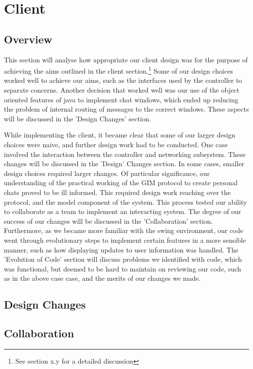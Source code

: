 \section{Client}

\subsection{Overview}

This section will analyse how appropriate our client design  was for the purpose of achieving the aims outlined in the client section.\footnote{See section x.y for a detailed discussion}  Some of our design choices worked well to achieve our aims, such as the interfaces used by the controller to separate concerns. Another decision that worked well was our use of the object oriented features of java to implement chat windows, which ended up reducing the problem of internal routing of messages to the correct windows. These aspects will be discussed in the 'Design Changes' section.

While implementing the client, it became clear that some of our larger design choices were naive, and further design work had to be conducted. One case involved the interaction between the controller and networking subsystem. These changes will be discussed in the 'Design' Changes section. In some cases, smaller design choices required larger changes. Of particular significance, our understanding of the practical working of the GIM protocol to create personal chats proved to be ill informed. This required design work reaching over the protocol, and the model component of the system. This process tested our ability to collaborate as a team to implement an interacting system. The degree of our success of our changes will be discussed in the 'Collaboration' section. Furthermore, as we became more familiar with the swing environment, our code went through evolutionary steps to implement certain features in a more sensible manner, such as how displaying updates to user information was handled. The 'Evolution of Code' section will discuss problems we identified with code, which was functional,  but deemed to be hard to maintain on reviewing our code, such as in the above case case, and the merits of our changes we made. 

\subsection{Design Changes}

\subsection{Collaboration}

